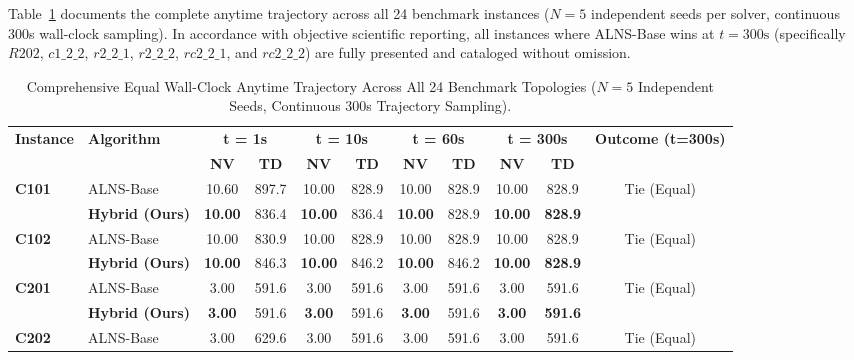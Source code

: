 \documentclass{article}
\begin{document}
Table~\ref{tab:supp_anytime_full_24} documents the complete anytime trajectory across all 24 benchmark instances ($N=5$ independent seeds per solver, continuous 300s wall-clock sampling). In accordance with objective scientific reporting, all instances where ALNS-Base wins at $t=300\text{s}$ (specifically $R202$, $c1\_2\_2$, $r2\_2\_1$, $r2\_2\_2$, $rc2\_2\_1$, and $rc2\_2\_2$) are fully presented and cataloged without omission.

\begin{table}[!htbp]
\caption{Comprehensive Equal Wall-Clock Anytime Trajectory Across All 24 Benchmark Topologies ($N=5$ Independent Seeds, Continuous 300s Trajectory Sampling).}
\label{tab:supp_anytime_full_24}
\centering
\scriptsize
\setlength{\tabcolsep}{3.5pt}
\begin{tabular*}{\textwidth}{@{\extracolsep{\fill}} ll cccccc cc c @{}}
\toprule
\multirow{2}{*}{\textbf{Instance}} & \multirow{2}{*}{\textbf{Algorithm}} & \multicolumn{2}{c}{\textbf{t = 1s}} & \multicolumn{2}{c}{\textbf{t = 10s}} & \multicolumn{2}{c}{\textbf{t = 60s}} & \multicolumn{2}{c}{\textbf{t = 300s}} & \multirow{2}{*}{\textbf{Outcome (t=300s)}} \\
\cmidrule(lr){3-4} \cmidrule(lr){5-6} \cmidrule(lr){7-8} \cmidrule(lr){9-10}
 & & \textbf{NV} & \textbf{TD} & \textbf{NV} & \textbf{TD} & \textbf{NV} & \textbf{TD} & \textbf{NV} & \textbf{TD} & \\
\midrule
\multirow{2}{*}{\textbf{C101}} & ALNS-Base & 10.60 & 897.7 & 10.00 & 828.9 & 10.00 & 828.9 & 10.00 & 828.9 & \multirow{2}{*}{Tie (Equal)} \\
 & \textbf{Hybrid (Ours)} & \textbf{10.00} & 836.4 & \textbf{10.00} & 836.4 & \textbf{10.00} & 828.9 & \textbf{10.00} & \textbf{828.9} & \\
\midrule
\multirow{2}{*}{\textbf{C102}} & ALNS-Base & 10.00 & 830.9 & 10.00 & 828.9 & 10.00 & 828.9 & 10.00 & 828.9 & \multirow{2}{*}{Tie (Equal)} \\
 & \textbf{Hybrid (Ours)} & \textbf{10.00} & 846.3 & \textbf{10.00} & 846.2 & \textbf{10.00} & 846.2 & \textbf{10.00} & \textbf{828.9} & \\
\midrule
\multirow{2}{*}{\textbf{C201}} & ALNS-Base & 3.00 & 591.6 & 3.00 & 591.6 & 3.00 & 591.6 & 3.00 & 591.6 & \multirow{2}{*}{Tie (Equal)} \\
 & \textbf{Hybrid (Ours)} & \textbf{3.00} & 591.6 & \textbf{3.00} & 591.6 & \textbf{3.00} & 591.6 & \textbf{3.00} & \textbf{591.6} & \\
\midrule
\multirow{2}{*}{\textbf{C202}} & ALNS-Base & 3.00 & 629.6 & 3.00 & 591.6 & 3.00 & 591.6 & 3.00 & 591.6 & \multirow{2}{*}{Tie (Equal)} \\

\end{tabular*}
\end{table}
\end{document}
